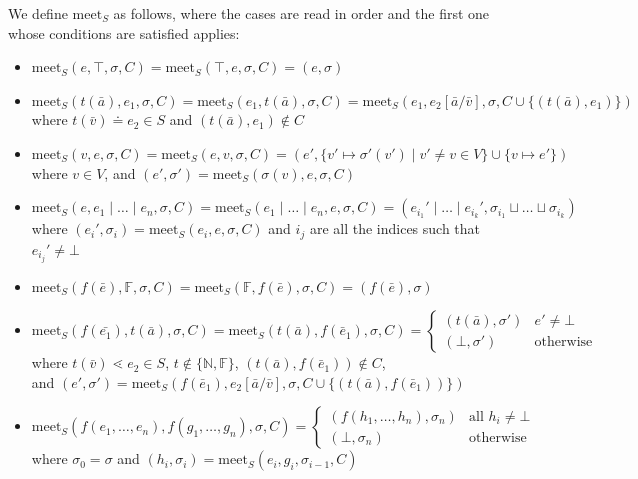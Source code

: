 \documentclass[a4paper]{amsart}
\newcommand\meet{\mathrm{meet}}
\begin{document}
We define $\mathrm{meet}_{S}$ as follows,
where the cases are read in order and the first one whose conditions are satisfied applies:
\begin{itemize}
	\item $\meet_{S}(e, \top, \sigma, C) = \meet_{S}(\top, e, \sigma, C) = (e, \sigma)$
	\item $\meet_S(t(\bar a), e_1, \sigma, C) = \meet_S(e_1, t(\bar a), \sigma, C) = \meet_S(e_1, e_2[\bar a/\bar v], \sigma, C \cup \{(t(\bar a), e_1)\})$\\
	      where $t(\bar v) \doteq e_2 \in S$ and $(t(\bar a), e_1) \notin C$
	\item $\meet_{S}(v, e, \sigma, C) = \meet_{S}(e, v, \sigma, C) = (e', \{v' \mapsto \sigma'(v') \mid v' \neq v \in V\} \cup \{v \mapsto e'\})$\\
	      where $v \in V$, and $(e', \sigma') = \meet_{S}(\sigma(v), e, \sigma, C)$
	\item $\meet_S(e, e_1 \mid \dots \mid e_n, \sigma, C) = \meet_S(e_1 \mid \dots \mid e_n, e, \sigma, C) = (e_{i_1}' \mid \dots \mid e_{i_k}', \sigma_{i_1} \sqcup \dots \sqcup \sigma_{i_k})$ \\
	      where $(e_i',\sigma_i) = \meet_S(e_i,e,\sigma,C)$ and $i_j$ are all the indices such that $e_{i_j}' \neq \bot$
	\item $\meet_S(f(\bar e),\mathbb{F},\sigma,C) = \meet_S(\mathbb{F}, f(\bar e),\sigma,C) = (f(\bar e), \sigma)$
    \item $\meet_S(f(\bar{e_1}),t(\bar a),\sigma,C) = \meet_S(t(\bar a),f(\bar e_1),\sigma,C) = \begin{cases} (t(\bar a),\sigma') & e' \neq \bot \\ (\bot,\sigma') & \text{otherwise} \end{cases}$\\
	      where $t(\bar v) \lessdot e_2 \in S$, $t \notin \{\mathbb{N}, \mathbb{F}\}$, $(t(\bar a),f(\bar e_1)) \notin C$,\\
          and $(e',\sigma') = \meet_S(f(\bar e_1),e_2[\bar a/\bar v],\sigma,C \cup \{(t(\bar a),f(\bar e_1))\})$
	\item $\meet_S(f(e_1,\dots,e_n),f(g_1,\dots,g_n), \sigma, C) = \begin{cases} (f(h_1,\dots,h_n),\sigma_n) & \text{all } h_i \neq \bot \\ (\bot,\sigma_n) & \text{otherwise} \end{cases}$\\
	      where $\sigma_0 = \sigma$ and $(h_i, \sigma_i) = \meet_S(e_i,g_i,\sigma_{i-1}, C)$

\end{itemize}
\end{document}
